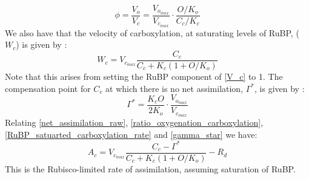 \documentclass[11pt]{article} %
\begin{document}
\begin{equation} \label{ratio_oxygenation_carboxylation}
\phi = \frac{V_o}{V_c} = \frac{V_{o_{max}}}{V_{c_{max}}}\cdot\frac{O/K_o}{C_c/K_c}
\end{equation}
We also have that the velocity of carboxylation, at saturating levels of RuBP, ($W_c$) is given by \cite{GrantTestsimplebiochemical1989}:
\begin{equation} \label{RuBP_satuarted_carboxylation_rate}
W_c = V_{c_{max}} \frac{C_c}{C_c + K_c (1 + O / K_o)}
\end{equation}
Note that this arises from setting the RuBP component of \eqref{V_c} to 1.
The compensation point for $C_c$ at which there is no net assimilation, $\Gamma^*$, is given by \cite{Farquharbiochemicalmodelphotosynthetic1980}:
\begin{equation} \label{gamma_star}
\Gamma^* = \frac{K_c O}{2 K_o}\cdot \frac{V_{o_{max}}}{V_{c_{max}}}
\end{equation}
Relating \eqref{net_assimilation_raw}, \eqref{ratio_oxygenation_carboxylation}, \eqref{RuBP_satuarted_carboxylation_rate} and \eqref{gamma_star} we have:
\begin{equation} \label{rubisco_limited_photosynthesis}
A_c = V_{c_{max}} \frac{C_c - \Gamma^*}{C_c+K_c(1+O/K_o)}-R_d
\end{equation}
This is the Rubisco-limited rate of assimilation, assuming saturation of RuBP.
\end{document}

